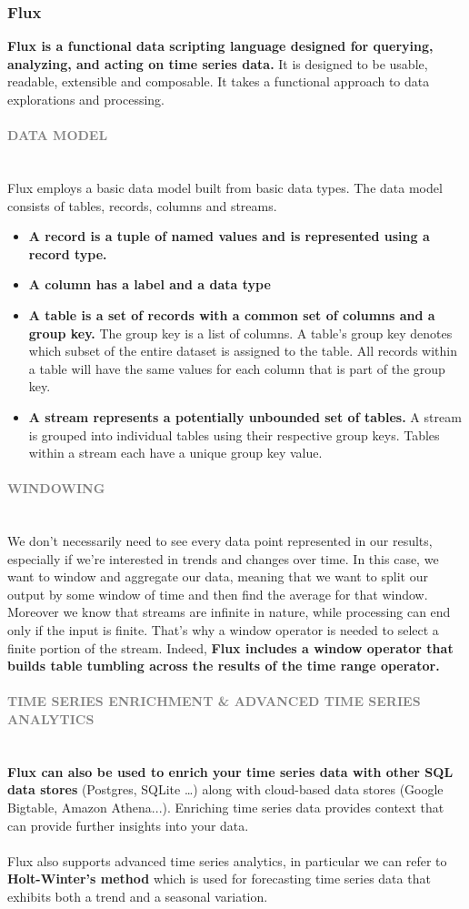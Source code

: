 \documentclass[10pt,a4paper]{article}
\newcommand{\nline}{\\~\\}
\newcommand{\myparagraph}[1]{\paragraph{\normalsize{\textcolor{gray}{\uppercase{\textbf{#1}}}} }\mbox{} \vspace{0.5em}\\}
\begin{document}
\subsubsection{Flux}
\textbf{Flux is a functional data scripting language designed for querying, analyzing, and acting on time series data.} It is designed to be usable, readable, extensible and composable. It takes a functional approach to data explorations and processing.
\myparagraph{Data Model}
Flux employs a basic data model built from basic data types. The data model consists of tables, records, columns and streams.
\begin{itemize}
	\item \textbf{A record is a tuple of named values and is represented using a record type.}
	\item \textbf{A column has a label and a data type}
	\item \textbf{A table is a set of records with a common set of columns and a group key.} The group key is a list of columns. A table’s group key denotes which subset of the entire dataset is assigned to the table. All records within a table will have the same values for each column that is part of the group key.
	\item \textbf{A stream represents a potentially unbounded set of tables.} A stream is grouped into individual tables using their respective group keys. Tables within a stream each have a unique group key value.
\end{itemize}
\myparagraph{Windowing}
We don’t necessarily need to see every data point represented in our results, especially if we’re interested in trends and changes over time. In this case, we want to window and aggregate our data, meaning that we want to split our output by some window of time and then find the average for that window. \\
Moreover we know that streams are infinite in nature, while processing can end only if the input is finite. That’s why a window operator is needed to select a finite portion of the stream. Indeed, \textbf{Flux includes a window operator that builds table tumbling across the results of the time range operator.}
\myparagraph{Time Series Enrichment \& Advanced Time Series Analytics}
\textbf{Flux can also be used to enrich your time series data with other SQL data stores} (Postgres, SQLite …) along with cloud-based data stores (Google Bigtable, Amazon Athena...). Enriching time series data provides context that can provide further insights into your data.
\nline
Flux also supports advanced time series analytics, in particular we can refer to \textbf{Holt-Winter’s method} which is used for forecasting time series data that exhibits both a trend and a seasonal variation.
\end{document}
